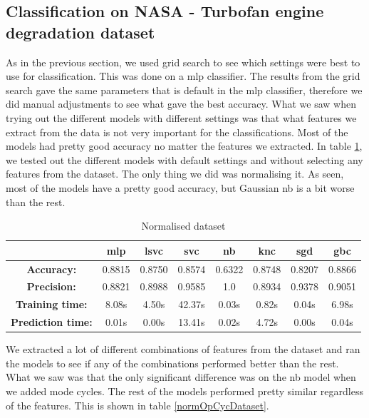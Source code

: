 \documentclass[english, a4paper]{report}
\begin{document}
{{        \subsection{Classification on NASA - Turbofan engine degradation dataset}
        {
            As in the previous section, we used grid search to see which settings were best to use for classification. This was done on a \gls{mlp} classifier. The results from the grid search gave the same parameters that is default in the \gls{mlp} classifier, therefore we did manual adjustments to see what gave the best accuracy. What we saw when trying out the different models with different settings was that what features we extract from the data is not very important for the classifications. Most of the models had pretty good accuracy no matter the features we extracted. In table \ref{normDataset}, we tested out the different models with default settings and without selecting any features from the dataset. The only thing we did was normalising it. As seen, most of the models have a pretty good accuracy, but Gaussian \gls{nb} is a bit worse than the rest. 
            
            \begin{table}[H]
            \centering
                \begin{tabular}{|c|c|c|c|c|c|c|c|}
                    \hline
                    \textbf{} & \textbf{\acrshort{mlp}} & \textbf{\acrshort{lsvc}} & \textbf{\acrshort{svc}} & \textbf{\acrshort{nb}} & \textbf{\acrshort{knc}} & \textbf{\acrshort{sgd}} & \textbf{\acrshort{gbc}} \\ \hline
                    \textbf{Accuracy:} & 0.8815 & 0.8750 & 0.8574 & 0.6322 & 0.8748 & 0.8207 & 0.8866 \\ \hline
                    \textbf{Precision:} & 0.8821 & 0.8988 & 0.9585 & 1.0 & 0.8934 & 0.9378 & 0.9051 \\ \hline
                    \textbf{Training time:} & 8.08s & 4.50s & 42.37s & 0.03s & 0.82s & 0.04s & 6.98s \\ \hline
                    \textbf{Prediction time:} & 0.01s & 0.00s & 13.41s & 0.02s & 4.72s & 0.00s & 0.04s \\ \hline
                \end{tabular}
            \caption{Normalised dataset}
            \label{normDataset}
            \end{table}
            
            We extracted a lot of different combinations of features from the dataset and ran the models to see if any of the combinations performed better than the rest. What we saw was that the only significant difference was on the \gls{nb} model when we added mode cycles. The rest of the models performed pretty similar regardless of the features. This is shown in table \ref{normOpCycDataset}. 
            
}}}
\end{document}
